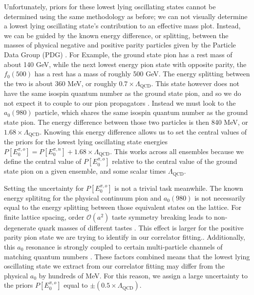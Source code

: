 Unfortunately, priors for these lowest lying oscillating states cannot be determined using the same methodology as before; we can not visually determine a lowest lying oscillating state's contribution to an effective mass plot. Instead, we can be guided by the known energy difference, or splitting, between the masses of physical negative and positive parity particles given by the Particle Data Group (PDG) \cite{ParticleDataGroup:2024cfk}.  For Example, the ground state pion has a rest mass of about 140 GeV, while the next lowest energy pion state with opposite parity, the $f_0(500)$ has a rest has a mass of roughly 500 GeV.  The energy splitting between the two is about 360 MeV, or roughly $0.7\times\Lambda_\mathrm{QCD}$.  This state however does not have the same isospin quantum number as the ground state pion, and so we do not expect it to couple to our pion propagators \cite{PhysRevD.70.094505, PhysRevD.73.114503}.  Instead we must look to the $a_0(980)$ particle, which shares the same isospin quantum number as the ground state pion.  The energy difference between those two particles is then 840 MeV, or $1.68 \times \Lambda_\mathrm{QCD}$. Knowing this energy difference allows us to set the central values of the priors for the lowest lying oscillating state energies $P[E_0^{\pi,o}] = P[E_0^{\pi,n}] + 1.68 \times \Lambda_\mathrm{QCD}$.  This works across all ensembles because we define the central value of $P[E_0^{\pi,o}]$ relative to the central value of the ground state pion on a given ensemble, and some scalar times $\Lambda_\mathrm{QCD}$.  

Setting the uncertainty for $P[E_0^{\pi,o}]$ is not a trivial task meanwhile.  The known energy splititng for the physical continuum pion and $a_0(980)$ is not necessarily equal to the energy splitting between those equivalent states on the lattice.  For finite lattice spacing, order $\mathcal{O}(a^2)$ taste symmetry breaking leads to non-degenerate quark masses of different tastes \cite{HISQ:2006rc, PhysRevD.77.074505}. This effect is larger for the positive parity pion state we are trying to identify in our correlator fitting.\cite{PhysRevD.111.094506, Bernard:2006gj}.  Additionally, this $a_0$ resonance is strongly coupled to certain multi-particle channels of matching quantum numbers \cite{PhysRevD.93.094506}.  These factors combined means that the lowest lying oscillating state we extract from our correlator fitting may differ from the physical $a_0$ by hundreds of MeV.  For this reason, we assign a large uncertainty to the priors $P[E_0^{\pi,o}]$ equal to $\pm (0.5\times \Lambda_\mathrm{QCD})$.

